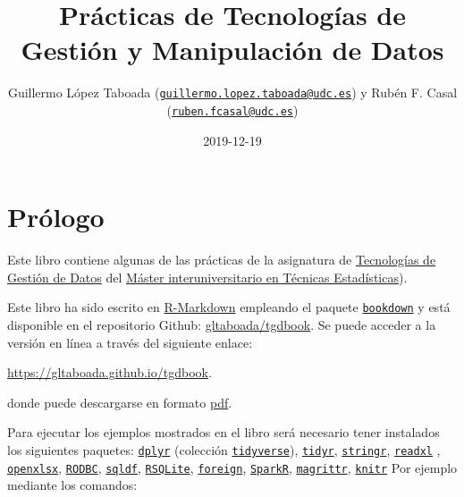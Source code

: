 \documentclass[]{book}
\title{Prácticas de Tecnologías de Gestión y Manipulación de Datos}
\author{Guillermo López Taboada
(\href{mailto:guillermo.lopez.taboada@udc.es}{\nolinkurl{guillermo.lopez.taboada@udc.es}})
y Rubén F. Casal
(\href{mailto:ruben.fcasal@udc.es}{\nolinkurl{ruben.fcasal@udc.es}})}
\date{2019-12-19}
\begin{document}
\maketitle

{
\setcounter{tocdepth}{1}
\tableofcontents
}
\chapter*{Prólogo}\label{prologo}

Este libro contiene algunas de las prácticas de la asignatura de
\href{http://eamo.usc.es/pub/mte/index.php/es/?option=com_content\&view=article\&id=2202\&idm=38\&a\%C3\%B1o=2019}{Tecnologías
de Gestión de Datos} del \href{http://eio.usc.es/pub/mte}{Máster
interuniversitario en Técnicas Estadísticas}).

Este libro ha sido escrito en
\href{http://rmarkdown.rstudio.com}{R-Markdown} empleando el paquete
\href{https://bookdown.org/yihui/bookdown/}{\texttt{bookdown}} y está
disponible en el repositorio Github:
\href{https://github.com/gltaboada/tgdbook}{gltaboada/tgdbook}. Se puede
acceder a la versión en línea a través del siguiente enlace:

\url{https://gltaboada.github.io/tgdbook}.

donde puede descargarse en formato
\href{https://gltaboada.github.io/tgdbook/Practicas_de_TGD.pdf}{pdf}.

Para ejecutar los ejemplos mostrados en el libro será necesario tener
instalados los siguientes paquetes:
\href{https://dplyr.tidyverse.org}{\texttt{dplyr}} (colección
\href{https://www.tidyverse.org/}{\texttt{tidyverse}}),
\href{https://tidyr.tidyverse.org}{\texttt{tidyr}},
\href{https://stringr.tidyverse.org}{\texttt{stringr}},
\href{https://readxl.tidyverse.org}{\texttt{readxl}} ,
\href{https://cran.r-project.org/web/packages/openxlsx/index.html}{\texttt{openxlsx}},
\href{https://cran.r-project.org/web/packages/RODBC/index.html}{\texttt{RODBC}},
\href{https://cran.r-project.org/web/packages/sqldf/index.html}{\texttt{sqldf}},
\href{https://r-dbi.github.io/RSQLite}{\texttt{RSQLite}},
\href{https://cran.r-project.org/web/packages/foreign/index.html}{\texttt{foreign}},
\href{https://cran.r-project.org/web/packages/SparkR/index.html}{\texttt{SparkR}},
\href{https://cran.r-project.org/web/packages/magrittr/index.html}{\texttt{magrittr}},
\href{https://yihui.name/knitr}{\texttt{knitr}} Por ejemplo mediante los
comandos:
\end{document}
